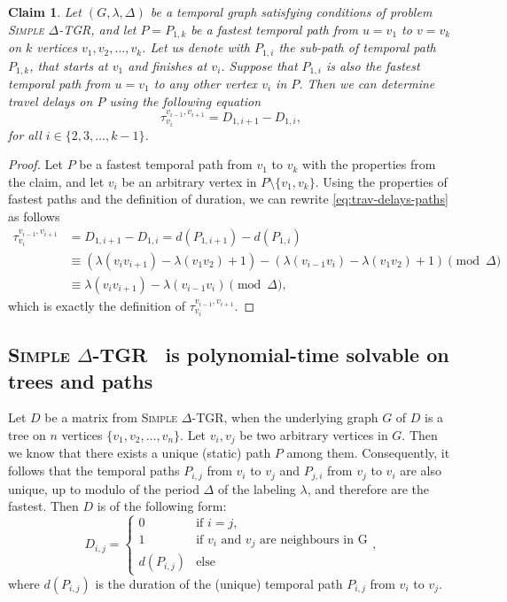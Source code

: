 \documentclass[11pt,a4paper]{article}
\newtheorem{claim}[theorem]{Claim}
\theoremstyle{remark}
\theoremstyle{definition}
\newcommand{\deltaExact}{\textsc{Simple $\Delta$-TGR}}
\begin{document}
\begin{claim} \label{claim:unique-fastest-path-allDelays}
    Let $(G, \lambda, \Delta)$ be a temporal graph satisfying conditions of problem \deltaExact,
    and let $P=P_{1,k}$ be a fastest temporal path from $u=v_1$ to $v=v_k$ on $k$ vertices $v_1,v_2,\dots,v_k$.
    Let us denote with $P_{1,i}$ the sub-path of temporal path $P_{1,k}$, that starts at $v_1$ and finishes at $v_i$.
    Suppose that $P_{1,i}$ is also the fastest temporal path from $u=v_1$ to any other vertex $v_i$ in $P$.
    Then we can determine travel delays on $P$ using the following equation
    \begin{equation}\label{eq:trav-delays-paths}
        \tau_{v_i}^{v_{i-1},v_{i+1}} = D_{1,i+1} - D_{1,i},
    \end{equation}
    for all $i \in \{2,3, \dots, k-1\}$.
\end{claim}

\begin{proof}
    Let $P$ be a fastest temporal path from $v_1$ to $v_k$ with the properties from the claim, and let $v_i$ be an arbitrary vertex in $P \setminus \{v_1,v_k\}$.
    Using the properties of fastest paths and the definition of duration, we can rewrite \cref{eq:trav-delays-paths} as follows
    \begin{align*}
        \tau_{v_i}^{v_{i-1},v_{i+1}} & = D_{1,i+1} - D_{1,i} =  d(P_{1,i+1}) - d(P_{1,i}) \\
        & \equiv 
        \left(\lambda(v_{i}v_{i+1}) - \lambda(v_1v_2) + 1\right) -  
        \left(\lambda(v_{i-1}v_{i}) - \lambda(v_1v_2) + 1\right) \pmod \Delta \\
        & \equiv \lambda(v_{i}v_{i+1}) - \lambda(v_{i-1}v_{i}) \pmod \Delta,
        \end{align*}
    which is exactly the definition of $\tau_{v_i}^{v_{i-1},v_{i+1}}$.
\end{proof}

\subsection{
\texorpdfstring{\deltaExact\ } {Simple Delta-TGR}
is polynomial-time solvable on trees and paths}

Let $D$ be a matrix from \deltaExact, when the underlying graph $G$ of $D$ is a tree on $n$ vertices $\{v_1, v_2, \dots, v_n\}$.
Let $v_i,v_j$ be two arbitrary vertices in $G$. Then we know that there exists a unique (static) path $P$ among them.
Consequently, it follows that the temporal paths $P_{i,j}$ from $v_i$ to $v_j$ and $P_{j,i}$ from $v_j$ to $v_i$ are also unique, up to modulo of the period $\Delta$ of the labeling $\lambda$,
and therefore are the fastest.
Then $D$ is of the following form:
\begin{equation*}
    D_{i,j} =
    \begin{cases}
    0 & \text{if $i = j$}, \\
    1 & \text{if $v_i$ and $v_j$ are neighbours in G}\\
    d(P_{i,j}) & \text{else}
    \end{cases},
\end{equation*}
where $d(P_{i,j})$ is the duration of the (unique) temporal path $P_{i,j}$ from $v_i$ to $v_j$.
\end{document}
